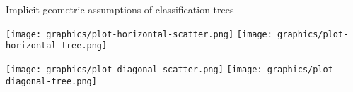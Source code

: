

\begin{frame}{\vskip -0.4cm \large Implicit geometric assumptions of classification trees}

\begin{center}
\vskip -0.1cm
\texttt{[image: graphics/plot-horizontal-scatter.png]}
\quad\quad
\texttt{[image: graphics/plot-horizontal-tree.png]}
\end{center}

\begin{center}
\texttt{[image: graphics/plot-diagonal-scatter.png]}
\quad\quad
\texttt{[image: graphics/plot-diagonal-tree.png]}
\end{center}

\end{frame}
\normalsize

